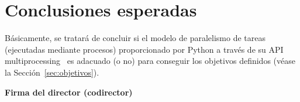 \documentclass[titlepage, 12pt, a4paper, oneside]{article}
\begin{document}
\section{Conclusiones esperadas}
\label{sec:conclusiones}
Básicamente, se tratará de concluir si el modelo de paralelismo de
tareas (ejecutadas mediante procesos) proporcionado por Python a
través de su API multiprocessing~\cite{multiprocessing} es adacuado (o
no) para conseguir los objetivos definidos (véase la
Sección~\ref{sec:objetivos}).




\begin{center}
  \textbf{Firma del director (codirector)}
\end{center}
\end{document}
